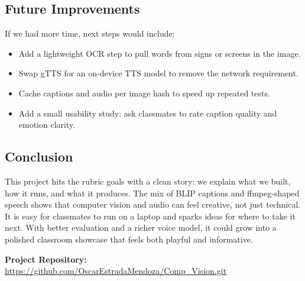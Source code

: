 \documentclass[11pt]{article}
\begin{document}
\subsection{Future Improvements}
If we had more time, next steps would include:
\begin{itemize}
    \item Add a lightweight OCR step to pull words from signs or screens in the image.
    \item Swap gTTS for an on-device TTS model to remove the network requirement.
    \item Cache captions and audio per image hash to speed up repeated tests.
    \item Add a small usability study: ask classmates to rate caption quality and emotion clarity.
\end{itemize}

\subsection{Conclusion}
This project hits the rubric goals with a clean story: we explain what we built, how it runs, and what it produces. The mix of BLIP captions and ffmpeg-shaped speech shows that computer vision and audio can feel creative, not just technical. It is easy for classmates to run on a laptop and sparks ideas for where to take it next. With better evaluation and a richer voice model, it could grow into a polished classroom showcase that feels both playful and informative.

\bigskip
\noindent\textbf{Project Repository:} \url{https://github.com/OscarEstradaMendoza/Comp_Vision.git}
\end{document}
